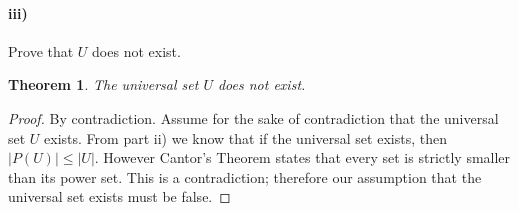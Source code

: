 \documentclass[10pt,letter]{article}
\newtheorem*{thm}{Theorem}
\begin{document}
\paragraph{iii)} Prove that $U$ does not exist.\\

\begin{thm} The universal set $U$ does not exist.
\end{thm}

\begin{proof} By contradiction. Assume for the sake of contradiction that the universal set $U$ exists. From part ii) we know that if the universal set exists, then $|P(U)| \leq |U|$. However Cantor's Theorem states that every set is strictly smaller than its power set. This is a contradiction; therefore our assumption that the universal set exists must be false.
\end{proof}


\end{document}
